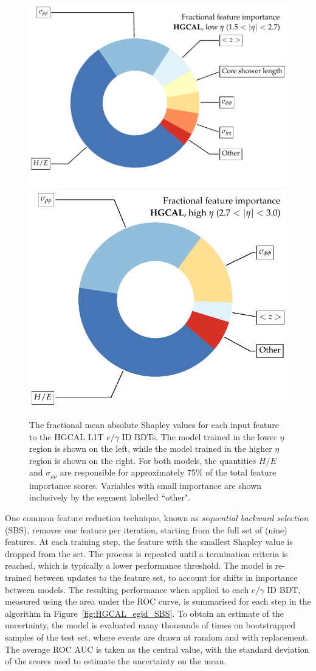 \begin{figure}[htbp!]
\centering
\includegraphics[width=0.49\linewidth]{Figures/Detector/HGCAL/featureSelection/pie_chart_low_eta.pdf}\hfill%
\includegraphics[width=0.39\linewidth]{Figures/Detector/HGCAL/featureSelection/pie_chart_high_eta.pdf}
\caption[The feature importance for inputs to the HGCAL L1T $e/\gamma$ identification BDTs.]{The fractional mean absolute Shapley values for each input feature to the HGCAL L1T $e/\gamma$ ID BDTs. The model trained in the lower $\eta$ region is shown on the left, while the model trained in the higher $\eta$ region is shown on the right. For both models, the quantities $H/E$ and $\sigma_{\rho\rho}$ are responsible for approximately 75\% of the total feature importance scores. Variables with small importance are shown inclusively by the segment labelled ``other".}
\label{fig:HGCAL_shap_pie_charts}
\end{figure}

One common feature reduction technique, known as \textit{sequential backward selection} (SBS), removes one feature per iteration, starting from the full set of (nine) features. At each training step, the feature with the smallest Shapley value is dropped from the set. The process is repeated until a termination criteria is reached, which is typically a lower performance threshold. The model is re-trained between updates to the feature set, to account for shifts in importance between models. The resulting performance when applied to each $e/\gamma$ ID BDT, measured using the area under the ROC curve, is summarised for each step in the algorithm in Figure~\ref{fig:HGCAL_egid_SBS}. To obtain an estimate of the uncertainty, the model is evaluated many thousands of times on bootstrapped samples of the test set, where events are drawn at random and with replacement. The average ROC AUC is taken as the central value, with the standard deviation of the scores used to estimate the uncertainty on the mean. 


